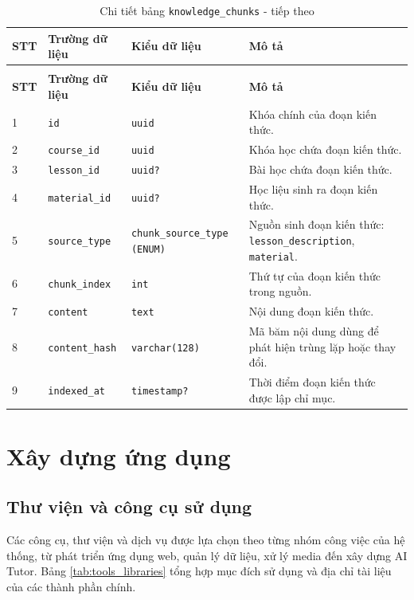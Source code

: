 \documentclass[../DoAn.tex]{subfiles}
\begin{document}
{\begin{longtable}{|p{}|p{}|p{}|p{}|}
\caption{Chi tiết bảng \texttt{knowledge\_chunks}}
\label{tab:db_knowledge_chunks}\\
\hline
\textbf{STT} & \textbf{Trường dữ liệu} & \textbf{Kiểu dữ liệu} & \textbf{Mô tả} \\ \hline
\endfirsthead
\caption[]{Chi tiết bảng \texttt{knowledge\_chunks} - tiếp theo}\\
\hline
\textbf{STT} & \textbf{Trường dữ liệu} & \textbf{Kiểu dữ liệu} & \textbf{Mô tả} \\ \hline
\endhead
1 & \texttt{id} & \texttt{uuid} & Khóa chính của đoạn kiến thức. \\ \hline
2 & \texttt{course\_id} & \texttt{uuid} & Khóa học chứa đoạn kiến thức. \\ \hline
3 & \texttt{lesson\_id} & \texttt{uuid?} & Bài học chứa đoạn kiến thức. \\ \hline
4 & \texttt{material\_id} & \texttt{uuid?} & Học liệu sinh ra đoạn kiến thức. \\ \hline
5 & \texttt{source\_type} & \texttt{chunk\_source\_type (ENUM)} & Nguồn sinh đoạn kiến thức: \texttt{lesson\_description}, \texttt{material}. \\ \hline
6 & \texttt{chunk\_index} & \texttt{int} & Thứ tự của đoạn kiến thức trong nguồn. \\ \hline
7 & \texttt{content} & \texttt{text} & Nội dung đoạn kiến thức. \\ \hline
8 & \texttt{content\_hash} & \texttt{varchar(128)} & Mã băm nội dung dùng để phát hiện trùng lặp hoặc thay đổi. \\ \hline
9 & \texttt{indexed\_at} & \texttt{timestamp?} & Thời điểm đoạn kiến thức được lập chỉ mục. \\ \hline
\end{longtable}
}

\section{Xây dựng ứng dụng}
\subsection{Thư viện và công cụ sử dụng}
Các công cụ, thư viện và dịch vụ được lựa chọn theo từng nhóm công việc của hệ thống, từ phát triển ứng dụng web, quản lý dữ liệu, xử lý media đến xây dựng AI Tutor. Bảng \ref{tab:tools_libraries} tổng hợp mục đích sử dụng và địa chỉ tài liệu của các thành phần chính.
\end{document}
